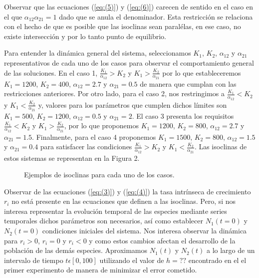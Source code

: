 \documentclass{article}
\begin{document}
Observar que las ecuaciones (\ref{eq:(5)}) y (\ref{eq:(6)}) carecen de sentido en el caso en el que \(\alpha_{12}\alpha_{21} = 1\) dado que se anula el denominador. Esta restricción se relaciona con el hecho de que es posible que las isoclinas sean paralélas, en ese caso, no existe intersección y por lo tanto punto de equilibrio.

Para entender la dinámica general del sistema, seleccionamos \(K_1\), \(K_2\), \(\alpha_{12}\) y \(\alpha_{21}\) representativos de cada uno de los casos para observar el comportamiento general de las soluciones. En el caso 1,  \(\frac {K_1}{\alpha_12} > K_2\) y \(K_1 > \frac {K_2}{\alpha_{21}}\) por lo que estableceremos \(K_1 = 1200\), \(K_2 = 400\), \(\alpha_{12} = 2.7\) y \(\alpha_{21} = 0.5\) de manera que cumplan con las restricciones anteriores. Por otro lado, para el caso 2, nos restringimos a \(\frac {K_1}{\alpha_12} < K_2\) y \(K_1 < \frac {K_2}{\alpha_{21}}\) y, valores para los parámetros que cumplen dichos límites son \(K_1 = 500\), \(K_2 = 1200\), \(\alpha_{12} = 0.5\)  y \(\alpha_{21} = 2\). El caso 3 presenta los requisitos \(\frac {K_1}{\alpha_12} < K_2\) y \(K_1 > \frac {K_2}{\alpha_{21}}\), por lo que proponemos \(K_1 = 1200\), \(K_2 = 800\), \(\alpha_{12} = 2.7\) y \(\alpha_{21} = 1.5\). Finalmente, para el caso 4 proponemos \(K_1 = 1500\), \(K_2 = 800\), \(\alpha_{12} = 1.5\) y \(\alpha_{21} = 0.4\) para satisfacer las condiciones \(\frac {K_1}{\alpha_12} > K_2\) y \(K_1 < \frac {K_2}{\alpha_{21}}\). Las isoclinas de estos sistemas se representan en la Figura 2.  

\begin{figure}
    \centering
        \caption{Ejemplos de isoclinas para cada uno de los casos.}
    \label{fig:isoclinas}
\end{figure}

Observar de las ecuaciones (\ref{eq:(3)}) y (\ref{eq:(4)}) la tasa intrínseca de crecimiento \(r_i\) no está presente en las ecuaciones que definen a las isoclinas. Pero, si nos interesa representar la evolución temporal de las especies mediante series temporales dichos parámetros son necesarios, así como establecer \(N_1(t = 0)\) y \(N_2(t = 0)\) condiciones iniciales del sistema. Nos interesa observar la dinámica para \(r_i > 0\), \(r_i = 0\) y \(r_i < 0\) y como estos cambios afectan el desarrollo de la población de las demás especies. Aproximamos \(N_1(t)\) y \(N_2(t)\) a lo largo de un intervalo de tiempo \(t \epsilon [0, 100]\) utilizando el valor de \(h = ??\) encontrado en el el primer experimento de manera de minimizar el error cometido.
\end{document}
